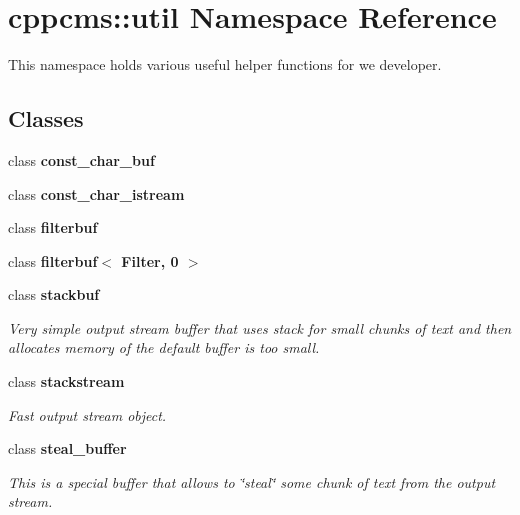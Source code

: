 \section{cppcms\+:\+:util Namespace Reference}
\label{namespacecppcms_1_1util}


This namespace holds various useful helper functions for we developer.  


\subsection*{Classes}
\begin{DoxyCompactItemize}
\item 
class {\bf const\+\_\+char\+\_\+buf}
\item 
class {\bf const\+\_\+char\+\_\+istream}
\item 
class {\bf filterbuf}
\item 
class {\bf filterbuf$<$ Filter, 0 $>$}
\item 
class {\bf stackbuf}
\begin{DoxyCompactList}\small\item\em Very simple output stream buffer that uses stack for small chunks of text and then allocates memory of the default buffer is too small. \end{DoxyCompactList}\item 
class {\bf stackstream}
\begin{DoxyCompactList}\small\item\em Fast output stream object. \end{DoxyCompactList}\item 
class {\bf steal\+\_\+buffer}
\begin{DoxyCompactList}\small\item\em This is a special buffer that allows to \char`\"{}steal\char`\"{} some chunk of text from the output stream. \end{DoxyCompactList}\end{DoxyCompactItemize}

